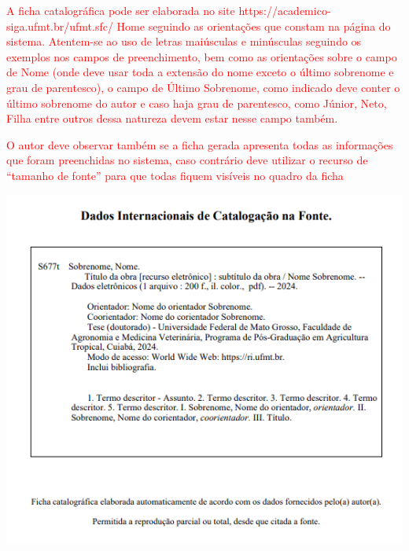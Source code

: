\documentclass[
	12pt,				%
	openright,			%
	oneside,			%
	a4paper,			%
	english,			%
	french,				%
	spanish,			%
	brazil				%
	]{abntex2UFMT}
\begin{document}
\begin{fichacatalografica}

\noindent\textcolor{red}{A ficha catalográfica pode ser elaborada
no site https://academico-siga.ufmt.br/ufmt.sfc/ Home seguindo as
orientações que constam na página do sistema. Atentem-se ao uso de
letras maiúsculas e minúsculas seguindo os exemplos nos campos de
preenchimento, bem como as orientações sobre o campo de Nome (onde
deve usar toda a extensão do nome exceto o último sobrenome e grau
de parentesco), o campo de Último Sobrenome, como indicado deve conter
o último sobrenome do autor e caso haja grau de parentesco, como Júnior,
Neto, Filha entre outros dessa natureza devem estar nesse campo também.}

\noindent\textcolor{red}{O autor deve observar também se a ficha
gerada apresenta todas as informações que foram preenchidas no sistema,
caso contrário deve utilizar o recurso de \textquotedblleft tamanho
de fonte\textquotedblright{} para que todas fiquem visíveis no quadro
da ficha}

\vspace{0.15\linewidth}

\begin{center}
\includegraphics[scale=0.75]{figs/ficha.png}
\par\end{center}

\end{fichacatalografica}
\end{document}

